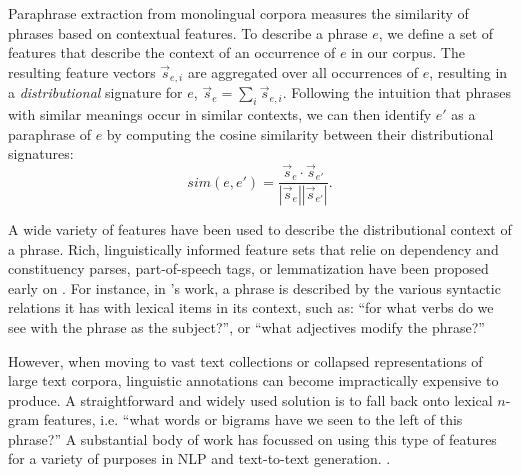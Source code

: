 \documentclass[11pt]{article}
\begin{document}
Paraphrase extraction from monolingual corpora measures the similarity
of phrases based on contextual features. To describe a phrase $e$, we
define a set of features that describe the context of an occurrence of
$e$ in our corpus. The resulting feature vectors $\vec{s}_{e,i}$ are
aggregated over all occurrences of $e$, resulting in a
\emph{distributional} signature for $e$, $\vec{s}_e = \sum_i
\vec{s}_{e,i}$.  Following the intuition that phrases with similar
meanings occur in similar contexts, we can then identify $e'$ as a
paraphrase of $e$ by computing the cosine similarity between their
distributional signatures:
\begin{equation*}
  \mathit{sim}(e, e') = \frac{\vec{s}_e \cdot \vec{s}_{e'}}{|\vec{s}_e||\vec{s}_{e'}|}.
\end{equation*}

A wide variety of features have been used to describe the
distributional context of a phrase. Rich, linguistically informed
feature sets that relie on dependency and constituency parses,
part-of-speech tags, or lemmatization have been proposed early on
\cite{ChurchHanks91,Lin2001}. For instance, in 's
work, a phrase is described by the various syntactic relations it has
with lexical items in its context, such as: ``for what verbs do we see
with the phrase as the subject?'', or ``what adjectives modify the
phrase?''

However, when moving to vast text collections or collapsed
representations of large text corpora, linguistic annotations can
become impractically expensive to produce. A straightforward and
widely used solution is to fall back onto lexical $n$-gram features,
i.e.  ``what words or bigrams have we seen to the left of this
phrase?'' A substantial body of work has focussed on using this type
of features for a variety of purposes in NLP and text-to-text
generation.
\cite{LapataKellerSaLP05,Bhagat2008,LinEtAlLREC10,VanDurmeLallACL10}.

\end{document}
